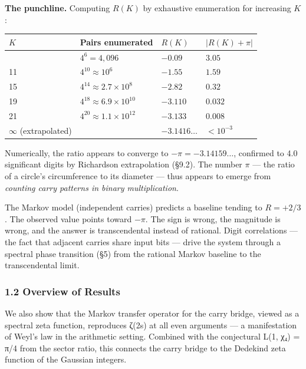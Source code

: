 \documentclass[
  11pt,
]{article}
\begin{document}
\textbf{The punchline.} Computing \(R(K)\) by exhaustive enumeration for
increasing \(K\):

\begin{longtable}[]{@{}llll@{}}
\toprule\noalign{}
\(K\) & Pairs enumerated & \(R(K)\) & \(\lvert R(K) + \pi\rvert\) \\
\midrule\noalign{}
\endhead
\bottomrule\noalign{}
\endlastfoot
7 & \(4^6 = 4{,}096\) & \(-0.09\) & \(3.05\) \\
11 & \(4^{10} \approx 10^6\) & \(-1.55\) & \(1.59\) \\
15 & \(4^{14} \approx 2.7 \times 10^8\) & \(-2.82\) & \(0.32\) \\
19 & \(4^{18} \approx 6.9 \times 10^{10}\) & \(-3.110\) & \(0.032\) \\
21 & \(4^{20} \approx 1.1 \times 10^{12}\) & \(-3.133\) & \(0.008\) \\
\(\infty\) (extrapolated) & & \(-3.1416\ldots\) & \(< 10^{-3}\) \\
\end{longtable}

Numerically, the ratio appears to converge to \(-\pi = -3.14159\ldots\),
confirmed to 4.0 significant digits by Richardson extrapolation (§9.2). The
number \(\pi\) --- the ratio of a circle's circumference to its diameter ---
thus appears to emerge from \emph{counting carry patterns in binary
multiplication}.

The Markov model (independent carries) predicts a baseline tending to
\(R = +2/3\). The observed value points toward \(-\pi\). The sign is wrong, the
magnitude is wrong, and the answer is transcendental instead of rational. Digit
correlations --- the fact that adjacent carries share input bits --- drive the
system through a spectral phase transition (§5) from the rational Markov
baseline to the transcendental limit.

\subsubsection{1.2 Overview of Results}\label{overview-of-results}

We also show that the Markov transfer operator for the carry bridge, viewed as a
spectral zeta function, reproduces ζ(2s) at all even arguments --- a
manifestation of Weyl's law in the arithmetic setting. Combined with the
conjectural L(1, χ₄) = π/4 from the sector ratio, this connects the carry bridge
to the Dedekind zeta function of the Gaussian integers.
\end{document}
